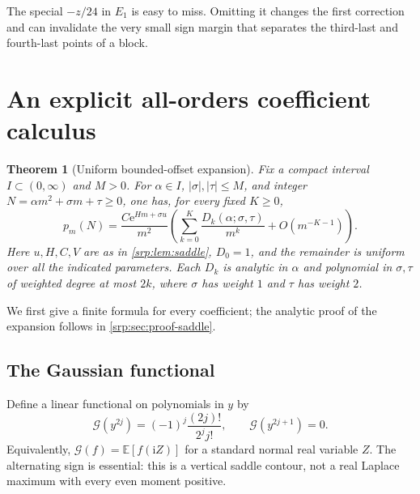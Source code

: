 \documentclass[11pt,a4paper]{article}
\numberwithin{equation}{section}
\newtheorem{theorem}{Theorem}[section]
\theoremstyle{definition}
\theoremstyle{remark}
\newcommand{\e}{\mathrm e}
\newcommand{\ii}{\mathrm i}
\newcommand{\G}{\mathcal G}
\begin{document}
The special $-z/24$ in $E_1$ is easy to miss. Omitting it changes the
first correction and can invalidate the very small sign margin that
separates the third-last and fourth-last points of a block.

\section{An explicit all-orders coefficient calculus}
\label{srp:sec:coefficients}

\begin{theorem}[Uniform bounded-offset expansion]
\label{srp:thm:allorders}
Fix a compact interval $I\subset(0,\infty)$ and $M>0$. For
$\alpha\in I$, $|\sigma|,|\tau|\le M$, and integer
$N=\alpha m^2+\sigma m+\tau\ge0$, one has, for every fixed $K\ge0$,
\begin{equation}
 p_m(N)=\frac{C\e^{Hm+\sigma u}}{m^2}
 \left(\sum_{k=0}^K\frac{D_k(\alpha;\sigma,\tau)}{m^k}
       +O(m^{-K-1})\right).
 \label{srp:eq:allorders}
\end{equation}
Here $u,H,C,V$ are as in \cref{srp:lem:saddle}, $D_0=1$, and the remainder is
uniform over all the indicated parameters. Each $D_k$ is analytic in
$\alpha$ and polynomial in $\sigma,\tau$ of weighted degree at most $2k$,
where $\sigma$ has weight $1$ and $\tau$ has weight $2$.
\end{theorem}

We first give a finite formula for every coefficient; the analytic proof
of the expansion follows in \cref{srp:sec:proof-saddle}.

\subsection{The Gaussian functional}
Define a linear functional on polynomials in $y$ by
\begin{equation}
 \G(y^{2j})=(-1)^j\frac{(2j)!}{2^j j!},\qquad
 \G(y^{2j+1})=0.
 \label{srp:eq:gaussian}
\end{equation}
Equivalently, $\G(f)=\mathbb E[f(\ii Z)]$ for a standard normal real
variable $Z$. The alternating sign is essential: this is a vertical
saddle contour, not a real Laplace maximum with every even moment
positive.
\end{document}
